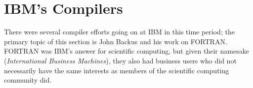 \section{IBM's Compilers}

There were several compiler efforts going on at IBM in this time period;
the primary topic of this section is John Backus and his work on FORTRAN.
FORTRAN was IBM's answer for scientific computing, but given their namesake
(\textit{International Business Machines}), they also had business users
who did not necessarily have the same interests as members of the scientific
computing community did.







